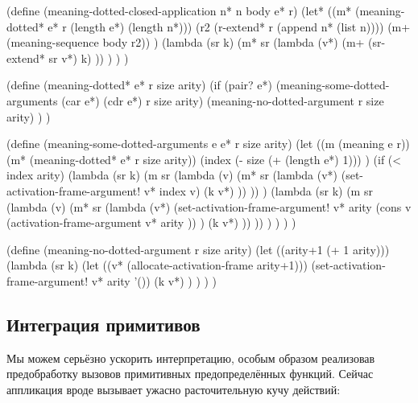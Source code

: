 \begin{code:lisp}
(define (meaning-dotted-closed-application n* n body e* r)
  (let* ((m* (meaning-dotted* e* r (length e*) (length n*)))
         (r2 (r-extend* r (append n* (list n))))
         (m+ (meaning-sequence body r2)) )
    (lambda (sr k)
      (m* sr (lambda (v*)
               (m+ (sr-extend* sr v*) k) )) ) ) )

(define (meaning-dotted* e* r size arity)
  (if (pair? e*)
      (meaning-some-dotted-arguments (car e*) (cdr e*) r size arity)
      (meaning-no-dotted-argument r size arity) ) )

(define (meaning-some-dotted-arguments e e* r size arity)
  (let ((m (meaning e r))
        (m* (meaning-dotted* e* r size arity))
        (index (- size (+ (length e*) 1))) )
    (if (< index arity)
        (lambda (sr k)
          (m sr (lambda (v)
                  (m* sr (lambda (v*)
                           (set-activation-frame-argument! v* index v)
                           (k v*) )) )) )
        (lambda (sr k)
          (m sr (lambda (v)
                  (m* sr (lambda (v*)
                           (set-activation-frame-argument!
                            v* arity
                            (cons v (activation-frame-argument
                                     v* arity )) )
                           (k v*) )) )) ) ) ) )

(define (meaning-no-dotted-argument r size arity)
  (let ((arity+1 (+ 1 arity)))
    (lambda (sr k)
      (let ((v* (allocate-activation-frame arity+1)))
        (set-activation-frame-argument! v* arity '())
        (k v*) ) ) ) )
\end{code:lisp}


\subsection{Интеграция примитивов}\label{fast/fast/ssect:integrating}

Мы можем серьёзно ускорить интерпретацию, особым образом реализовав
предобработку вызовов примитивных предопределённых функций. Сейчас аппликация
вроде  вызывает ужасно расточительную кучу действий:

